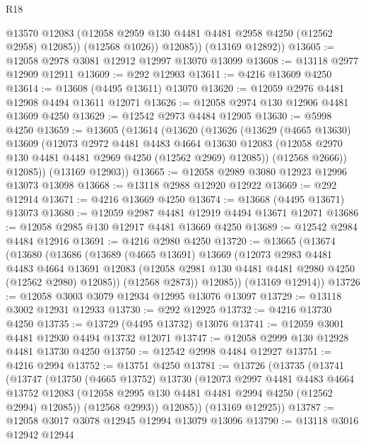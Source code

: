\begin{lexlean}{R18}
\begin{coremodule}
              @13570
              @12083
              (@12058 @2959 @130 @4481 @4481 @2958 @4250 (@12562 @2958) @12085))
            (@12568 @1026))
          @12085))
      (@13169 @12892))
@13605 := @12058 @2978 @3081 @12912 @12997 @13070 @13099
@13608 := @13118 @2977 @12909 @12911
@13609 := @292 @12903
@13611 := @4216 @13609 @4250
@13614 := @13608 (@4495 @13611) @13070
@13620 := @12059 @2976 @4481 @12908 @4494 @13611 @12071
@13626 := @12058 @2974 @130 @12906 @4481 @13609 @4250
@13629 := @12542 @2973 @4484 @12905
@13630 := @5998 @4250
@13659 := @13605
    (@13614
      (@13620
        (@13626
          (@13629
            (@4665 @13630)
            @13609
            (@12073
              @2972
              @4481
              @4483
              @4664
              @13630
              @12083
              (@12058 @2970 @130 @4481 @4481 @2969 @4250 (@12562 @2969) @12085))
            (@12568 @2666))
          @12085))
      (@13169 @12903))
@13665 := @12058 @2989 @3080 @12923 @12996 @13073 @13098
@13668 := @13118 @2988 @12920 @12922
@13669 := @292 @12914
@13671 := @4216 @13669 @4250
@13674 := @13668 (@4495 @13671) @13073
@13680 := @12059 @2987 @4481 @12919 @4494 @13671 @12071
@13686 := @12058 @2985 @130 @12917 @4481 @13669 @4250
@13689 := @12542 @2984 @4484 @12916
@13691 := @4216 @2980 @4250
@13720 := @13665
    (@13674
      (@13680
        (@13686
          (@13689
            (@4665 @13691)
            @13669
            (@12073
              @2983
              @4481
              @4483
              @4664
              @13691
              @12083
              (@12058 @2981 @130 @4481 @4481 @2980 @4250 (@12562 @2980) @12085))
            (@12568 @2873))
          @12085))
      (@13169 @12914))
@13726 := @12058 @3003 @3079 @12934 @12995 @13076 @13097
@13729 := @13118 @3002 @12931 @12933
@13730 := @292 @12925
@13732 := @4216 @13730 @4250
@13735 := @13729 (@4495 @13732) @13076
@13741 := @12059 @3001 @4481 @12930 @4494 @13732 @12071
@13747 := @12058 @2999 @130 @12928 @4481 @13730 @4250
@13750 := @12542 @2998 @4484 @12927
@13751 := @4216 @2994
@13752 := @13751 @4250
@13781 := @13726
    (@13735
      (@13741
        (@13747
          (@13750
            (@4665 @13752)
            @13730
            (@12073
              @2997
              @4481
              @4483
              @4664
              @13752
              @12083
              (@12058 @2995 @130 @4481 @4481 @2994 @4250 (@12562 @2994) @12085))
            (@12568 @2993))
          @12085))
      (@13169 @12925))
@13787 := @12058 @3017 @3078 @12945 @12994 @13079 @13096
@13790 := @13118 @3016 @12942 @12944

\end{coremodule}
\end{lexlean}
